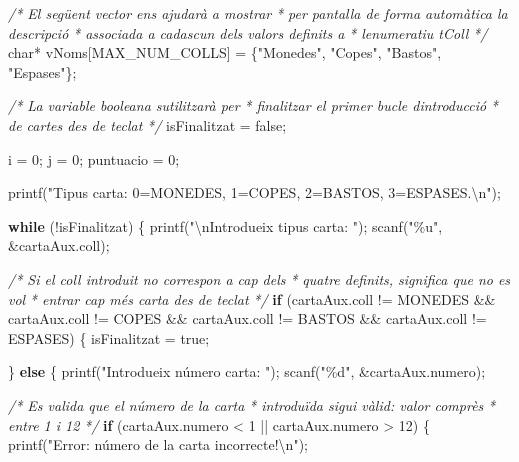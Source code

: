 \documentclass[]{book}
\newenvironment{Shaded}{\begin{snugshade}}{\end{snugshade}}
\newcommand{\CommentTok}[1]{\textcolor[rgb]{0.56,0.35,0.01}{\textit{#1}}}
\newcommand{\ControlFlowTok}[1]{\textcolor[rgb]{0.13,0.29,0.53}{\textbf{#1}}}
\newcommand{\DataTypeTok}[1]{\textcolor[rgb]{0.13,0.29,0.53}{#1}}
\newcommand{\DecValTok}[1]{\textcolor[rgb]{0.00,0.00,0.81}{#1}}
\newcommand{\NormalTok}[1]{#1}
\newcommand{\SpecialCharTok}[1]{\textcolor[rgb]{0.00,0.00,0.00}{#1}}
\newcommand{\StringTok}[1]{\textcolor[rgb]{0.31,0.60,0.02}{#1}}
\begin{document}
\begin{Shaded}
\begin{Highlighting}[]
    \CommentTok{/* El següent vector ens ajudarà a mostrar}
\CommentTok{     * per pantalla de forma automàtica la descripció }
\CommentTok{     * associada a cadascun dels valors definits a }
\CommentTok{     * l\textquotesingle{}enumeratiu tColl}
\CommentTok{     */}
    \DataTypeTok{char}\NormalTok{* vNoms[MAX\_NUM\_COLLS] = \{}\StringTok{"Monedes"}\NormalTok{, }\StringTok{"Copes"}\NormalTok{, }\StringTok{"Bastos"}\NormalTok{, }\StringTok{"Espases"}\NormalTok{\};}

    \CommentTok{/* La variable booleana s\textquotesingle{}utilitzarà per}
\CommentTok{     * finalitzar el primer bucle d\textquotesingle{}introducció}
\CommentTok{     * de cartes des de teclat}
\CommentTok{     */}
\NormalTok{    isFinalitzat = false;}
    
\NormalTok{    i = }\DecValTok{0}\NormalTok{;}
\NormalTok{    j = }\DecValTok{0}\NormalTok{;}
\NormalTok{    puntuacio = }\DecValTok{0}\NormalTok{;}
    
\NormalTok{    printf(}\StringTok{"Tipus carta: 0=MONEDES, 1=COPES, 2=BASTOS, 3=ESPASES.}\SpecialCharTok{\textbackslash{}n}\StringTok{"}\NormalTok{);}

    \ControlFlowTok{while}\NormalTok{ (!isFinalitzat) \{}
\NormalTok{        printf(}\StringTok{"}\SpecialCharTok{\textbackslash{}n}\StringTok{Introdueix tipus carta: "}\NormalTok{);}
\NormalTok{        scanf(}\StringTok{"\%u"}\NormalTok{, \&cartaAux.coll);}
        
        \CommentTok{/* Si el coll introduit no correspon a cap dels}
\CommentTok{         * quatre definits, significa que no es vol }
\CommentTok{         * entrar cap més carta des de teclat}
\CommentTok{         */}
        \ControlFlowTok{if}\NormalTok{ (cartaAux.coll != MONEDES \&\& cartaAux.coll != COPES}
\NormalTok{            \&\& cartaAux.coll != BASTOS \&\& cartaAux.coll != ESPASES) \{}
\NormalTok{            isFinalitzat = true;}

\NormalTok{        \} }\ControlFlowTok{else}\NormalTok{ \{}
\NormalTok{            printf(}\StringTok{"Introdueix número carta: "}\NormalTok{);}
\NormalTok{            scanf(}\StringTok{"\%d"}\NormalTok{, \&cartaAux.numero);}
            
            \CommentTok{/* Es valida que el número de la carta}
\CommentTok{             * introduïda sigui vàlid: valor comprès}
\CommentTok{             * entre 1 i 12}
\CommentTok{             */}
            \ControlFlowTok{if}\NormalTok{ (cartaAux.numero \textless{} }\DecValTok{1}\NormalTok{ || cartaAux.numero \textgreater{} }\DecValTok{12}\NormalTok{) \{}
\NormalTok{                printf(}\StringTok{"Error: número de la carta incorrecte!}\SpecialCharTok{\textbackslash{}n}\StringTok{"}\NormalTok{);}
                

\end{Highlighting}
\end{Shaded}
\end{document}
